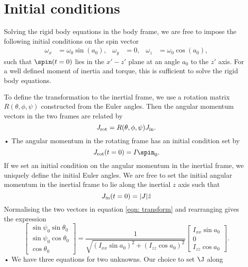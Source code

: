 \documentclass[/home/greg/Thesis/main/main.tex]{subfiles}
\begin{document}
\section{Initial conditions}

Solving the rigid body equations in the body frame, we are free to impose the
following initial conditions on the spin vector
\begin{align}\label{eqn: spin init}
\omega_{x} & = \omega_{0}\sin(a_{0}), & 
\omega_{y} & = 0, & 
\omega_{z} & = \omega_{0}\cos(a_{0}),
\end{align}
such that $\spin(t=0)$ lies in the $x' - z'$ plane at an angle $a_{0}$ to the
$z'$ axis. For a well defined moment of
inertia and torque, this is sufficient to solve the rigid body equations. 

To define the transformation to the inertial frame, we use a rotation matrix 
$R(\theta, \phi, \psi)$ constructed from the Euler angles. Then the 
angular momentum vectors in the two frames are related by 
\begin{equation}
J_{\textrm{rot}} = R(\theta, \phi, \psi) J_{\textrm{in}} .
\label{eqn: transform}
\end{equation}•
The angular momentum in the rotating frame has an initial condition 
set by 
\begin{equation}
  \Jr(t=0) = I \spin_0.
\end{equation}
If we set an initial condition on the angular momentum in the inertial frame,
we uniquely define the initial Euler angles. We are free to set the initial
angular momentum in the inertial frame to lie along the inertial $z$ axis such
that
\begin{equation}
  J_{\textrm{in}}(t=0) = |J|\hat{z} 
\end{equation}
Normalising the two vectors in equation \eqref{eqn: transform} and rearranging
gives the expression 
\begin{equation}
\left[ \begin{array}{c}
\sin \psi_{0} \sin \theta_{0} \\
\sin \psi_{0} \cos \theta_{0} \\
\cos \theta_{0}
\end{array}\right]
 = \frac{1}{\sqrt{(I_{xx}\sin a_{0})^{2} + (I_{zz}\cos a_{0})^{2}}} 
\left[ \begin{array}{c}
I_{xx}\sin a_{0} \\
0 \\
I_{zz} \cos a_{0}
\end{array}\right].
\end{equation}•
We have three equations for two unknowns. Our choice to set $\J$ along
\end{document}

